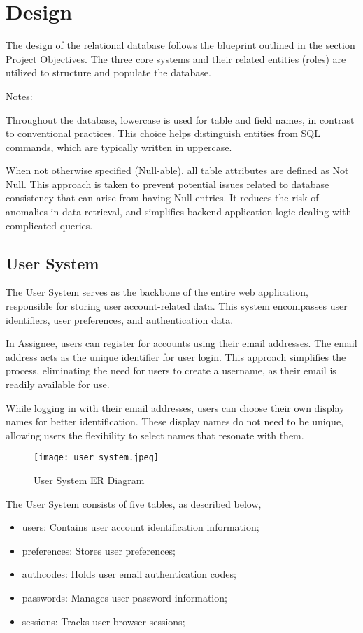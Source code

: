 \documentclass[12pt]{report}
\newcommand{\n}{\par}
\newcommand{\br}{\vspace{1 em}\n}
\begin{document}
\section{Design} \label{data-layer.design}
The design of the relational database follows the blueprint outlined in the section \hyperref[overview.project-objectives]{Project Objectives}.
The three core systems and their related entities (roles) are utilized to structure and populate the database.
\br
Notes:\n
Throughout the database, lowercase is used for table and field names, in contrast to conventional practices.
This choice helps distinguish entities from SQL commands, which are typically written in uppercase.\n
When not otherwise specified (Null-able), all table attributes are defined as Not Null.
This approach is taken to prevent potential issues related to database consistency that can arise from having Null entries.
It reduces the risk of anomalies in data retrieval, and simplifies backend application logic dealing with complicated queries.
\subsection{User System} \label{data-layer.design.user-system}
The User System serves as the backbone of the entire web application, responsible for storing user account-related data.
This system encompasses user identifiers, user preferences, and authentication data.
\br
In Assignee, users can register for accounts using their email addresses.
The email address acts as the unique identifier for user login.
This approach simplifies the process, eliminating the need for users to create a username,
as their email is readily available for use.
\br
While logging in with their email addresses, users can choose their own display names for better identification.
These display names do not need to be unique, allowing users the flexibility to select names that resonate with them.
\br
\begin{figure}
	\centering
	\texttt{[image: user\_system.jpeg]}
	\caption{User System ER Diagram}
	\label{fig:user-system-er}
\end{figure}
The User System consists of five tables, as described below,
\begin{itemize}
	\item users: Contains user account identification information;
	\item preferences: Stores user preferences;
	\item authcodes: Holds user email authentication codes;
	\item passwords: Manages user password information;
	\item sessions: Tracks user browser sessions;
\end{itemize}
\end{document}
